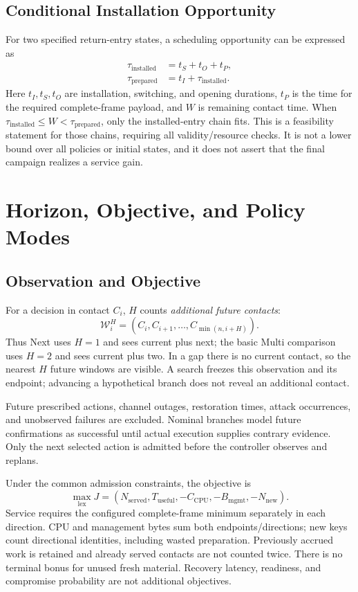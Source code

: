 \documentclass[conference]{IEEEtran}
\begin{document}
\subsection{Conditional Installation Opportunity}
For two specified return-entry states, a scheduling opportunity can be expressed as
\begin{align}
\tau_{\mathrm{installed}}&=t_S+t_O+t_P,\\
\tau_{\mathrm{prepared}}&=t_I+\tau_{\mathrm{installed}}.
\end{align}
Here $t_I,t_S,t_O$ are installation, switching, and opening durations, $t_P$ is the time for the required complete-frame payload, and $W$ is remaining contact time. When $\tau_{\mathrm{installed}}\leq W<\tau_{\mathrm{prepared}}$, only the installed-entry chain fits. This is a feasibility statement for those chains, requiring all validity/resource checks. It is not a lower bound over all policies or initial states, and it does not assert that the final campaign realizes a service gain.

\section{Horizon, Objective, and Policy Modes}
\subsection{Observation and Objective}
For a decision in contact $C_i$, $H$ counts \emph{additional future contacts}:
\begin{equation}
\mathcal W_i^H=(C_i,C_{i+1},\ldots,C_{\min(n,i+H)}).
\end{equation}
Thus Next uses $H=1$ and sees current plus next; the basic Multi comparison uses $H=2$ and sees current plus two. In a gap there is no current contact, so the nearest $H$ future windows are visible. A search freezes this observation and its endpoint; advancing a hypothetical branch does not reveal an additional contact.

Future prescribed actions, channel outages, restoration times, attack occurrences, and unobserved failures are excluded. Nominal branches model future confirmations as successful until actual execution supplies contrary evidence. Only the next selected action is admitted before the controller observes and replans.

Under the common admission constraints, the objective is
\begin{equation}
\max_{\mathrm{lex}} J=(N_{\mathrm{served}},T_{\mathrm{useful}},-C_{\mathrm{CPU}},-B_{\mathrm{mgmt}},-N_{\mathrm{new}}).
\label{eq:objective}
\end{equation}
Service requires the configured complete-frame minimum separately in each direction. CPU and management bytes sum both endpoints/directions; new keys count directional identities, including wasted preparation. Previously accrued work is retained and already served contacts are not counted twice. There is no terminal bonus for unused fresh material. Recovery latency, readiness, and compromise probability are not additional objectives.
\end{document}
